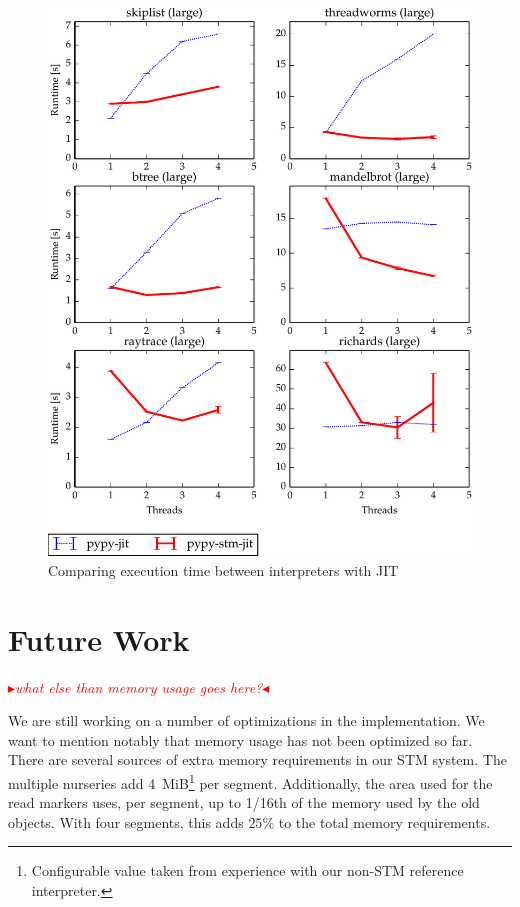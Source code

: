 \documentclass{sigplanconf}
\newcommand{\mynote}[2]{%
  \textcolor{red}{%
    \fbox{\bfseries\sffamily\scriptsize#1}%
    {\small$\blacktriangleright$\textsf{\emph{#2}}$\blacktriangleleft$}%
  }%
}
\newcommand\arigo[1]{\mynote{arigo}{#1}}
\begin{document}
\begin{figure}[h]
  \centering
  \includegraphics[width=1\columnwidth]{plots/performance.pdf}
  \caption{Comparing execution time between interpreters with JIT\label{fig:performance-jit}}
\end{figure}




\section{Future Work}

\arigo{what else than memory usage goes here?}

We are still working on a number of optimizations in the
implementation.  We want to mention notably that memory usage has not
been optimized so far.  There are several sources of extra memory
requirements in our STM system.  The multiple nurseries add
4~MiB\footnote{Configurable value taken from experience with our
  non-STM reference interpreter.} per segment.  Additionally, the area
used for the read markers uses, per segment, up to 1/16th of the
memory used by the old objects.  With four segments, this adds $25\%$
to the total memory requirements.
\end{document}
